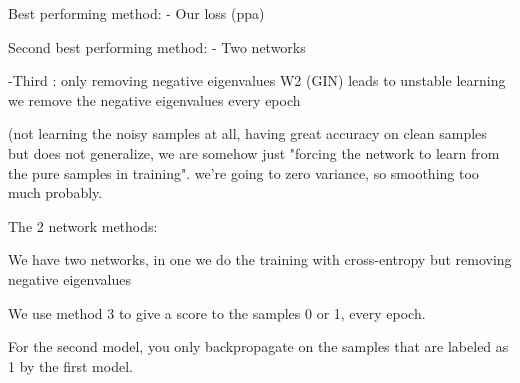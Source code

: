 
Best performing method:
- Our loss (ppa)

Second best performing method:
- Two networks

-Third : 
only removing negative eigenvalues W2 (GIN) leads to unstable learning we remove the negative eigenvalues every epoch 

(not learning the noisy samples at all, having great accuracy on clean samples but does not generalize, we are somehow just "forcing the network to learn from the pure samples in training". 
we're going to zero variance, so smoothing too much probably. 


The 2 network methods: 

We have two networks, in one we do the training with cross-entropy but removing negative eigenvalues 


We use method 3 to give a score to the samples 0 or 1, every epoch. 

For the second model, you only backpropagate on the samples that are labeled as 1 by the first model. 
